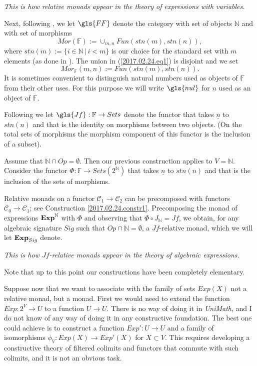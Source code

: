 \documentclass[onecolumn,12pt]{amsart}
\numberwithin{proposition}{subsection}
\newcommand{\sr}{\rightarrow}
\newcommand{\nn}{{\mathbb N}}
\newcommand{\nat}{\nn}
\newcommand{\uu}{\underline}
\newcommand{\C}{{\mathcal C}}
\newcommand{\FF}{{\mathbb F}}
\newcommand{\ff}[1]{\uu{#1}}
\begin{document}
{\em This is how relative monads appear in the theory of expressions with variables.}

Next, following \cite{FPT}, we let $\gls{FF}$ denote the category with set of
objects $\nat$ and with set of morphisms
%
\begin{equation}
\label{2017.02.24.eq1}
Mor(\FF):=\cup_{m,n}Fun(stn(m),stn(n)),
\end{equation}%
%
where $stn(m):=\{i\in\nat\,|\,i<m\}$ is our choice for the standard set with $m$
elements (as done in \cite{LandC}).
The union in (\ref{2017.02.24.eq1}) is disjoint and we set
%
$$Mor_{\FF}(m,n):=Fun(stn(m),stn(n)).$$
%
It is sometimes convenient to distinguish natural numbers used as objects of
$\FF$ from their other uses. For this purpose we will write $\gls{nul}$ for $n$
used as an object of $\FF$.

Following \cite{ACU} we let $\gls{Jf}:\FF\sr Sets$ denote the functor that takes $\ff n$ to
$stn(n)$ and that is the identity on morphisms between two objects.  (On the
total sets of morphisms the morphism component of this functor is the inclusion
of a subset).

Assume that $\nat\cap Op=\emptyset$. Then our previous construction applies to
$V=\nat$. Consider the functor $\Phi:\FF\sr Sets(2^{\nat})$ that takes $\ff{n}$
to $stn(n)$ and that is the inclusion of the sets of morphisms.

Relative monads on a functor $\C_1\sr \C_2$ can be precomposed with functors $\C_0\sr\C_1$; see Construction \ref{2017.02.24.constr1}. Precomposing the monad of expressions ${\bf Exp}^{\nat}$ with $\Phi$ and observing that $\Phi\circ J_{\nat}=Jf$, we obtain, for any algebraic signature $Sig$ such that $Op\cap \nat=\emptyset$, a $Jf$-relative monad, which we will let ${\bf Exp}_{Sig}$ denote. 

{\em This is how $Jf$-relative monads appear in the theory of algebraic expressions.} 

Note that up to this point our constructions have been completely elementary.

Suppose now that we want to associate with the family of sets $Exp(X)$ not a
relative monad, but a monad. First we would need to extend the function
$Exp:2^V\sr U$ to a function $U\sr U$. There is no way of doing it in
{\em UniMath}, and I do not know of any way of doing it in any constructive
foundation. The best one could achieve is to construct a function $Exp':U\sr U$
and a family of isomorphisms $\phi_V:Exp(X)\sr Exp'(X)$ for $X\subset V$. This
requires developing a constructive theory of filtered colimits and functors
that commute with such colimits, and it is not an obvious task.
\end{document}
